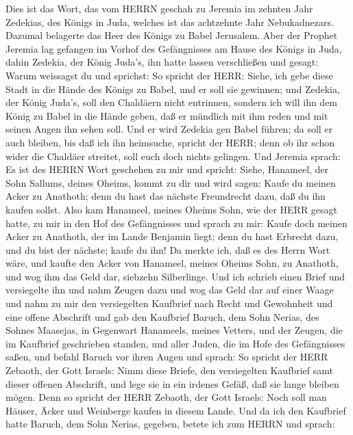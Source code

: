  Dies ist das Wort, das vom HERRN geschah zu Jeremia im
zehnten Jahr Zedekias, des Königs in Juda, welches ist das achtzehnte
Jahr Nebukadnezars.  Dazumal belagerte das Heer des Königs
zu Babel Jerusalem. Aber der Prophet Jeremia lag gefangen im Vorhof des
Gefängnisses am Hause des Königs in Juda,  dahin Zedekia,
der König Juda's, ihn hatte lassen verschließen und gesagt: Warum
weissagst du und sprichst: So spricht der HERR: Siehe, ich gebe diese
Stadt in die Hände des Königs zu Babel, und er soll sie gewinnen;
 und Zedekia, der König Juda's, soll den Chaldäern nicht
entrinnen, sondern ich will ihn dem König zu Babel in die Hände geben,
daß er mündlich mit ihm reden und mit seinen Augen ihn sehen soll.
 Und er wird Zedekia gen Babel führen; da soll er auch
bleiben, bis daß ich ihn heimsuche, spricht der HERR; denn ob ihr schon
wider die Chaldäer streitet, soll euch doch nichts gelingen.
 Und Jeremia sprach: Es ist des HERRN Wort geschehen zu mir
und spricht:  Siehe, Hanameel, der Sohn Sallums, deines
Oheims, kommt zu dir und wird sagen: Kaufe du meinen Acker zu Anathoth;
denn du hast das nächste Freundrecht dazu, daß du ihn kaufen sollst.
 Also kam Hanameel, meines Oheims Sohn, wie der HERR gesagt
hatte, zu mir in den Hof des Gefängnisses und sprach zu mir: Kaufe doch
meinen Acker zu Anathoth, der im Lande Benjamin liegt; denn du hast
Erbrecht dazu, und du bist der nächste; kaufe du ihn! Da merkte ich, daß
es des Herrn Wort wäre,  und kaufte den Acker von Hanameel,
meines Oheims Sohn, zu Anathoth, und wog ihm das Geld dar, siebzehn
Silberlinge.  Und ich schrieb einen Brief und versiegelte
ihn und nahm Zeugen dazu und wog das Geld dar auf einer Waage
 und nahm zu mir den versiegelten Kaufbrief nach Recht und
Gewohnheit und eine offene Abschrift  und gab den Kaufbrief
Baruch, dem Sohn Nerias, des Sohnes Maasejas, in Gegenwart Hanameels,
meines Vetters, und der Zeugen, die im Kaufbrief geschrieben standen,
und aller Juden, die im Hofe des Gefängnisses saßen,  und
befahl Baruch vor ihren Augen und sprach:  So spricht der
HERR Zebaoth, der Gott Israels: Nimm diese Briefe, den versiegelten
Kaufbrief samt dieser offenen Abschrift, und lege sie in ein irdenes
Gefäß, daß sie lange bleiben mögen.  Denn so spricht der
HERR Zebaoth, der Gott Israels: Noch soll man Häuser, Äcker und
Weinberge kaufen in diesem Lande.  Und da ich den Kaufbrief
hatte Baruch, dem Sohn Nerias, gegeben, betete ich zum HERRN und sprach:
